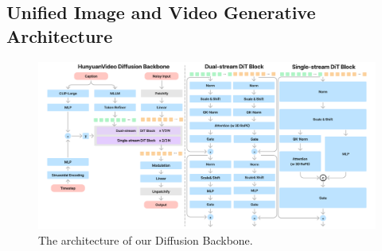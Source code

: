 \subsection{Unified Image and Video Generative Architecture}
\label{sec:architecture}


\begin{figure}[ht]
    \centering
    \includegraphics[width=\linewidth]{figures/dit_backbone.pdf}
    \caption{ The architecture of our \nameofmethod{} Diffusion Backbone.}
    \label{fig:dit_bnackbone}
\end{figure}

